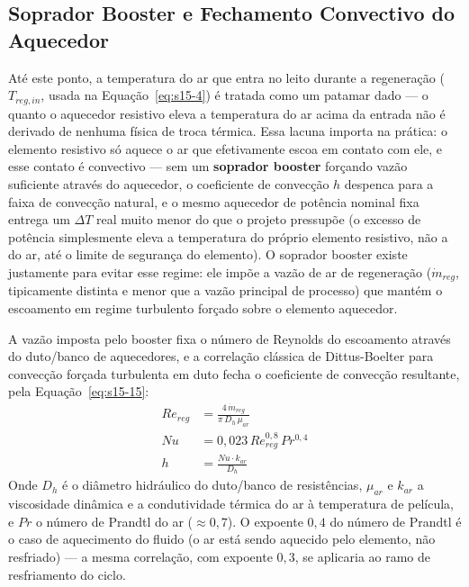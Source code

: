 \documentclass[12pt,a4paper]{article}
\numberwithin{equation}{section}
\numberwithin{table}{section}
\numberwithin{figure}{section}
\begin{document}
{		\subsection{\textbf{Soprador Booster e Fechamento Convectivo do Aquecedor}}
		Até este ponto, a temperatura do ar que entra no leito durante a regeneração ($T_{reg,in}$, usada na Equação~\eqref{eq:s15-4}) é tratada como um patamar dado — o quanto o aquecedor resistivo eleva a temperatura do ar acima da entrada não é derivado de nenhuma física de troca térmica. Essa lacuna importa na prática: o elemento resistivo só aquece o ar que efetivamente escoa em contato com ele, e esse contato é convectivo — sem um \textbf{soprador booster} forçando vazão suficiente através do aquecedor, o coeficiente de convecção $h$ despenca para a faixa de convecção natural, e o mesmo aquecedor de potência nominal fixa entrega um $\Delta T$ real muito menor do que o projeto pressupõe (o excesso de potência simplesmente eleva a temperatura do próprio elemento resistivo, não a do ar, até o limite de segurança do elemento). O soprador booster existe justamente para evitar esse regime: ele impõe a vazão de ar de regeneração ($\dot{m}_{reg}$, tipicamente distinta e menor que a vazão principal de processo) que mantém o escoamento em regime turbulento forçado sobre o elemento aquecedor.

		A vazão imposta pelo booster fixa o número de Reynolds do escoamento através do duto/banco de aquecedores, e a correlação clássica de Dittus-Boelter para convecção forçada turbulenta em duto \cite[Cap.~8]{incropera} fecha o coeficiente de convecção resultante, pela Equação~\eqref{eq:s15-15}:
		\begin{equation}\label{eq:s15-15}
		\begin{aligned}
			Re_{reg} &= \frac{4 \, \dot{m}_{reg}}{\pi \, D_h \, \mu_{ar}} \\[4pt]
			Nu &= 0{,}023 \, Re_{reg}^{0{,}8} \, Pr^{0{,}4} \\[4pt]
			h &= \frac{Nu \cdot k_{ar}}{D_h}
		\end{aligned}
	\end{equation}
		Onde $D_h$ é o diâmetro hidráulico do duto/banco de resistências, $\mu_{ar}$ e $k_{ar}$ a viscosidade dinâmica e a condutividade térmica do ar à temperatura de película, e $Pr$ o número de Prandtl do ar ($\approx 0{,}7$). O expoente $0{,}4$ do número de Prandtl é o caso de aquecimento do fluido (o ar está sendo aquecido pelo elemento, não resfriado) — a mesma correlação, com expoente $0{,}3$, se aplicaria ao ramo de resfriamento do ciclo.

}
\end{document}
